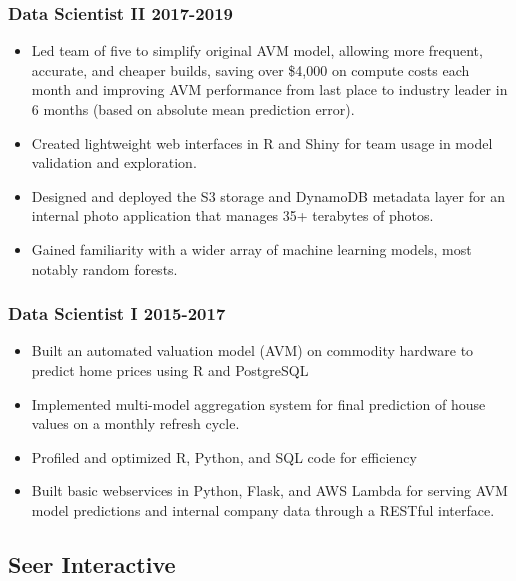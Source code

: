 \documentclass[11pt,a4paper,]{awesome-cv}
\providecommand{\tightlist}{%
	\setlength{\itemsep}{0pt}\setlength{\parskip}{0pt}}
\begin{document}
\hypertarget{data-scientist-ii--2019}{%
\subsubsection{\texorpdfstring{Data Scientist II
\hfill 2017-2019}{Data Scientist II -2019}}\label{data-scientist-ii--2019}}

\begin{itemize}
\tightlist
\item
  Led team of five to simplify original AVM model, allowing more
  frequent, accurate, and cheaper builds, saving over \$4,000 on compute
  costs each month and improving AVM performance from last place to
  industry leader in 6 months (based on absolute mean prediction error).
\item
  Created lightweight web interfaces in R and Shiny for team usage in
  model validation and exploration.
\item
  Designed and deployed the S3 storage and DynamoDB metadata layer for
  an internal photo application that manages 35+ terabytes of photos.
\item
  Gained familiarity with a wider array of machine learning models, most
  notably random forests.
\end{itemize}

\hypertarget{data-scientist-i--2017}{%
\subsubsection{\texorpdfstring{Data Scientist I
\hfill 2015-2017}{Data Scientist I -2017}}\label{data-scientist-i--2017}}

\begin{itemize}
\tightlist
\item
  Built an automated valuation model (AVM) on commodity hardware to
  predict home prices using R and PostgreSQL
\item
  Implemented multi-model aggregation system for final prediction of
  house values on a monthly refresh cycle.
\item
  Profiled and optimized R, Python, and SQL code for efficiency
\item
  Built basic webservices in Python, Flask, and AWS Lambda for serving
  AVM model predictions and internal company data through a RESTful
  interface.
\end{itemize}

\hypertarget{seer-interactive}{%
\subsection{\texorpdfstring{Seer Interactive
\hfill }{Seer Interactive }}\label{seer-interactive}}
\end{document}
